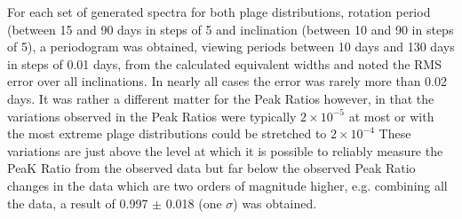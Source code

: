 \begin{table}[!htbp]
\caption{Simulated mean equivalent widths with associated standard deviations from simulations for the 2.7\%
  plage distributions and a set of rotation periods and inclinations. In the first table results are illustrated for
  various periods and for 30{\degree}, 60{\degree} and  90{\degree} inclinations. In the second table results are
  illustrated for various inclinations and 70, 80 and 90-day periods as these are close to the
  rotation period of \prox.}
\protect\label{table:modelcomp}
\end{table}

For each set of generated spectra for both plage distributions, rotation period (between 15 and 90 days in steps of 5
and inclination (between 10{\degree} and 90{\degree} in steps of 5\degree), a periodogram was obtained, viewing periods
between 10 days and 130 days in steps of 0.01 days, from the calculated equivalent widths and noted the RMS error over
all inclinations. In nearly all cases the error was rarely more than 0.02 days. It was rather a different matter for the
Peak Ratios however, in that the variations observed in the Peak Ratios were typically $2{\times}10^{-5}$ at most or with
the most extreme plage distributions could be stretched to $2{\times}10^{-4}$ These variations are just above the level
at which it is possible to reliably measure the PeaK Ratio from the observed data but far below the observed Peak Ratio
changes in the data which are two orders of magnitude higher, e.g. combining all the {\harps} data, a result of 0.997 $
\pm $ 0.018 (one $\sigma$) was obtained.

